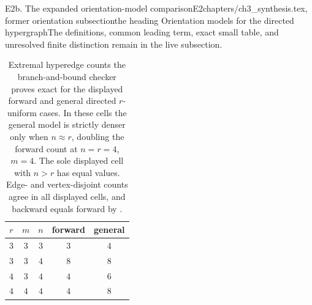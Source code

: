 \begin{offcut}{E2b. The expanded orientation-model comparison}{E2}{chapters/ch3\_synthesis.tex, former orientation subsection}{the heading Orientation models for the directed hypergraph}{The definitions, common leading term, exact small table, and unresolved finite distinction remain in the live subsection.}
\begin{table}[ht]
\centering
\begin{tabular}{ccccc}
\toprule
$r$ & $m$ & $n$ & forward & general \\
\midrule
$3$ & $3$ & $3$ & $3$ & $4$ \\
$3$ & $3$ & $4$ & $8$ & $8$ \\
$4$ & $3$ & $4$ & $4$ & $6$ \\
$4$ & $4$ & $4$ & $4$ & $8$ \\
\bottomrule
\end{tabular}
\caption{Extremal hyperedge counts the branch-and-bound checker proves exact for the displayed forward and general directed $r$-uniform cases. In these cells the general model is strictly denser only when $n \approx r$, doubling the forward count at $n=r=4$, $m=4$. The sole displayed cell with $n>r$ has equal values. Edge- and vertex-disjoint counts agree in all displayed cells, and backward equals forward by .}
\end{table}
\end{offcut}

